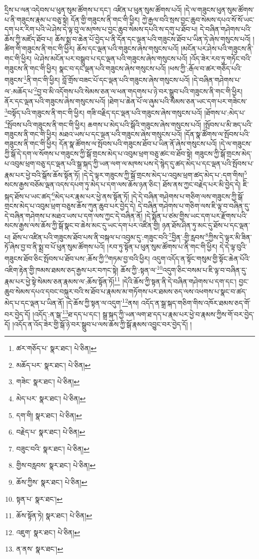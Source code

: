 དྲིས་པ་ལན་འདེབས་པ་ཕུན་སུམ་ཚོགས་པ་དང་། འཛིན་པ་ཕུན་སུམ་ཚོགས་པའོ། །དེ་ལ་གཟུངས་ཕུན་སུམ་ཚོགས་པ་ནི་གཟུངས་རྣམ་པ་བཅུ་སྟེ། དོན་གྱི་གཟུངས་ནི་གང་གི་ཕྱིར། ཀྱེ་རྒྱལ་བའི་སྲས་བྱང་ཆུབ་སེམས་དཔའ་སོ་སོ་ཡང་དག་པར་རིག་པའི་ཡེ་ཤེས་དེ་ལྟ་བུ་ལ་མཁས་པ་བྱང་ཆུབ་སེམས་དཔའི་ས་དགུ་པ་ཐོབ་པ། དེ་བཞིན་གཤེགས་པའི་ཆོས་ཀྱི་མཛོད་ཐོབ་པ། ཆོས་སྨྲ་བ་ཆེན་པོ་བྱེད་པ་ནི་དོན་དང་ལྡན་པའི་གཟུངས་ཐོབ་པ་ཡིན་ཏེ་ཞེས་གསུངས་པའོ། །ཚིག་གི་གཟུངས་ནི་གང་གི་ཕྱིར། ཆོས་དང་ལྡན་པའི་གཟུངས་ཞེས་གསུངས་པའོ། །མངོན་པར་ཤེས་པའི་གཟུངས་ནི་གང་གི་ཕྱིར། ཡེ་ཤེས་མངོན་པར་བསྒྲུབ་པ་དང་ལྡན་པའི་གཟུངས་ཞེས་གསུངས་པའོ། །འོད་ཟེར་རབ་ཏུ་གཏོང་བའི་གཟུངས་ནི་གང་གི་ཕྱིར། སྣང་བ་དང་ལྡན་པའི་གཟུངས་ཞེས་གསུངས་པའོ། །ཕས་ཀྱི་:རྒོལ་བ་ཚར་གཅོད་པའི་གཟུངས་\footnote{ཚར་གཅོད་པ་  སྣར་ཐང་།  པེ་ཅིན། }ནི་གང་གི་ཕྱིར། བློ་གྲོས་བཟང་པོ་དང་ལྡན་པའི་གཟུངས་ཞེས་གསུངས་པའོ། །དེ་བཞིན་གཤེགས་པ་ལ་:མཆོད་པ་\footnote{མཆོད་པར་  སྣར་ཐང་།  པེ་ཅིན། }བྱ་བ་མི་འདོགས་པའི་སེམས་ཅན་ལ་ཕན་གདགས་པ་ཉེ་བར་སྒྲུབ་པའི་གཟུངས་ནི་གང་གི་ཕྱིར། ནོར་དང་ལྡན་པའི་གཟུངས་ཞེས་གསུངས་པའོ། །ཐེག་པ་ཆེན་པོ་ལ་ཞུམ་པའི་སེམས་ཅན་ཡང་དག་པར་གཟེངས་\footnote{གཟེང་  སྣར་ཐང་།  པེ་ཅིན། }བསྟོད་པའི་གཟུངས་ནི་གང་གི་ཕྱིར། གཟི་བརྗིད་དང་ལྡན་པའི་གཟུངས་ཞེས་གསུངས་པའོ། །ཐོགས་པ་:མེད་པ་\footnote{མེད་པར་  སྣར་ཐང་།  པེ་ཅིན། }སྤོབས་པའི་གཟུངས་ནི་གང་གི་ཕྱིར། ཆགས་པ་མེད་པའི་སྒོའི་གཟུངས་ཞེས་གསུངས་པའོ། །སྤོབས་པ་མི་ཟད་པའི་གཟུངས་ནི་གང་གི་ཕྱིར། མཐའ་ཡས་པ་དང་ལྡན་པའི་གཟུངས་ཞེས་གསུངས་པའོ། །དོན་སྣ་ཚོགས་ལ་སྤོབས་པའི་གཟུངས་ནི་གང་གི་ཕྱིར། དོན་སྣ་ཚོགས་ལ་སྤོབས་པའི་གཟུངས་ཐོབ་པ་ཡིན་ནོ་ཞེས་གསུངས་པའོ། །དེ་ལ་གཟུངས་ཀྱི་སྒོ་དེ་དག་ལ་སོགས་པ་གཟུངས་ཀྱི་སྒོ་གྲངས་མེད་པ་འབུམ་ཕྲག་བཅུ་ཚང་བ་ཐོབ་སྟེ། གཟུངས་ཀྱི་སྒོ་གྲངས་མེད་པ་འབུམ་ཕྲག་བཅུ་དང་ལྡན་པའི་སྒྲ་སྐད་ཀྱི་ཡན་ལག་ལ་མཁས་པས་དེ་སྙེད་དུ་ཚད་མེད་པ་དང་ལྡན་པའི་སྤོབས་པ་རྣམ་པར་ཕྱེ་བའི་སྒོས་ཆོས་སྟོན་ཏོ། །དེ་དེ་ལྟར་གཟུངས་ཀྱི་སྒོ་གྲངས་མེད་པ་འབུམ་ཕྲག་ཚད་མེད་པ་:དག་གིས།\footnote{དག་གི།  སྣར་ཐང་།  པེ་ཅིན། } སངས་རྒྱས་བཅོམ་ལྡན་འདས་དཔག་ཏུ་མེད་པ་དག་ལས་ཆོས་ཉན་ཅིང་། ཐོས་ནས་ཀྱང་བརྗེད་པར་མི་བྱེད་དེ། ཇི་སྐད་ཐོས་པ་ཡང་ཚད་\footnote{བརྗེད་པ་  སྣར་ཐང་།  པེ་ཅིན། }མེད་པར་རྣམ་པར་ཕྱེ་ནས་སྟོན་ཏོ། །དེ་དེ་བཞིན་གཤེགས་པ་གཅིག་ལས་གཟུངས་ཀྱི་སྒོ་གྲངས་མེད་པ་འབུམ་ཕྲག་བཅུས་ཆོས་ཀུན་ཆུབ་པར་བྱེད་དེ། དེ་བཞིན་གཤེགས་པ་གཅིག་ལས་ཇི་ལྟ་བ་བཞིན་དུ་དེ་བཞིན་གཤེགས་པ་མཐའ་ཡས་པ་དག་ལས་ཀྱང་དེ་བཞིན་ནོ། །དེ་སྨོན་པ་ཙམ་གྱིས་ཡང་དག་པར་རྫོགས་པའི་སངས་རྒྱས་ལས་ཆོས་ཀྱི་སྒོ་སྣང་བ་ཆེས་མང་དུ་ཡང་དག་པར་འཛིན་གྱི། ཉན་ཐོས་ཤིན་ཏུ་མང་དུ་ཐོས་པ་དང་ལྡན་པ། ཐོས་པ་འཛིན་པའི་གཟུངས་ཐོབ་པས་ནི་བསྐལ་པ་འབུམ་དུ་:གཟུང་བའི་\footnote{བཟུང་བའི་  སྣར་ཐང་།  པེ་ཅིན། }བྱིན་:གྱི་རླབས་\footnote{གྱིས་བརླབས་  སྣར་ཐང་།  པེ་ཅིན། }ཀྱིས་དེ་ལྟར་མི་ཟིན་ཏོ་ཞེས་བྱ་བ་ནི་སྨྲ་བ་པོ་ཕུན་སུམ་ཚོགས་པའོ། །རབ་ཏུ་སྟོན་པ་ཕུན་སུམ་ཚོགས་པ་ནི་གང་གི་ཕྱིར། དེ་དེ་ལྟ་བུའི་གཟུངས་ཐོབ་ཅིང་སྤོབས་པ་ཐོབ་པས་:ཆོས་ཀྱི་\footnote{ཆོས་ཀྱིས་  སྣར་ཐང་།  པེ་ཅིན། }གཏམ་བྱ་བའི་ཕྱིར། འདུག་འདོད་ན་སྟོང་གསུམ་གྱི་སྟོང་ཆེན་པོའི་འཇིག་རྟེན་གྱི་ཁམས་ཐམས་ཅད་རྒྱས་པར་བཀང་སྟེ། ཆོས་ཀྱི་:སྟན་ལ་\footnote{སྟན་པ་  སྣར་ཐང་། }འདུག་ཅིང་བསམ་པ་ཇི་ལྟ་བ་བཞིན་དུ་རྣམ་པར་ཕྱེ་སྟེ་སེམས་ཅན་རྣམས་ལ་:ཆོས་སྟོན་ཏོ།\footnote{ཆོས་སྟོན་ཏེ།  སྣར་ཐང་།  པེ་ཅིན། } །དེའི་ཆོས་ཀྱི་སྟན་ནི་དེ་བཞིན་གཤེགས་པ་དག་དང་། བྱང་ཆུབ་སེམས་དཔའ་དབང་བསྐུར་བའི་ས་ཐོབ་པ་རྣམས་མ་གཏོགས་པར་ཐམས་ཅད་ལས་འཕགས་པ་སྣང་བ་ཚད་མེད་པ་དང་ལྡན་པ་ཡིན་ནོ། །དེ་ཆོས་ཀྱི་སྟན་ལ་འདུག་\footnote{འཇུག་  སྣར་ཐང་།  པེ་ཅིན། }ནས། འདོད་ན་སྒྲ་སྐད་གཅིག་གིས་འཁོར་ཐམས་ཅད་གོ་བར་བྱེད་དོ། །འདོད་:ན་སྒ་\footnote{ན་ནས་  སྣར་ཐང་། }ཐ་དད་པ་དང་། སྒྲ་སྐད་ཀྱི་ཡན་ལག་ཐ་དད་པ་རྣམ་པར་ཕྱེ་བ་རྣམས་ཀྱིས་གོ་བར་བྱེད་དོ། །འདོད་ན་འོད་ཟེར་གྱི་སྒོ་ཉེ་བར་སྒྲུབ་པ་ལས་ཆོས་ཀྱི་སྒོ་རྣམས་འབྱུང་བར་བྱེད་དོ། །
